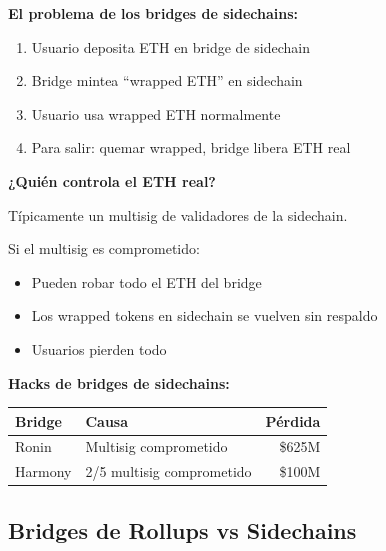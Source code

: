 \documentclass[11pt,a4paper,twoside,openright]{book}
\theoremstyle{definition}
\theoremstyle{plain}
\theoremstyle{remark}
\begin{document}
\begin{advertencia}
\textbf{El problema de los bridges de sidechains:}

\begin{enumerate}
    \item Usuario deposita ETH en bridge de sidechain
    \item Bridge mintea ``wrapped ETH'' en sidechain
    \item Usuario usa wrapped ETH normalmente
    \item Para salir: quemar wrapped, bridge libera ETH real
\end{enumerate}

\textbf{¿Quién controla el ETH real?}

Típicamente un multisig de validadores de la sidechain.

Si el multisig es comprometido:
\begin{itemize}
    \item Pueden robar todo el ETH del bridge
    \item Los wrapped tokens en sidechain se vuelven sin respaldo
    \item Usuarios pierden todo
\end{itemize}

\textbf{Hacks de bridges de sidechains:}

\begin{center}
\begin{tabular}{llr}
\toprule
\textbf{Bridge} & \textbf{Causa} & \textbf{Pérdida} \\
\midrule
Ronin & Multisig comprometido & \$625M \\
Harmony & 2/5 multisig comprometido & \$100M \\
\bottomrule
\end{tabular}
\end{center}
\end{advertencia}

\subsection{Bridges de Rollups vs Sidechains}
\end{document}
